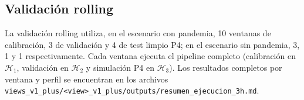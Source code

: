 \subsection{Validaci\'on rolling}

La validaci\'on rolling utiliza, en el escenario con pandemia, 10 ventanas de
calibraci\'on, 3 de validaci\'on y 4 de test limpio P4; en el escenario sin
pandemia, 3, 1 y 1 respectivamente. Cada ventana ejecuta el pipeline completo
(calibraci\'on en $\mathcal{H}_1$, validaci\'on en $\mathcal{H}_2$ y simulaci\'on
P4 en $\mathcal{H}_3$). Los resultados completos por ventana y perfil se
encuentran en los archivos
\texttt{views\_v1\_plus/<view>\_v1\_plus/outputs/resumen\_ejecucion\_3h.md}.
